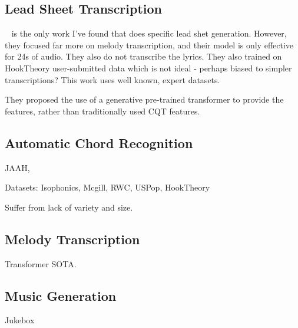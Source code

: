 \subsection{Lead Sheet Transcription}

~\cite{MelodyTranscriptionViaGenerativePreTraining} is the only work I've found that does specific lead shet generation. However, they focused far more on melody transcription, and their model is only effective for 24s of audio. They also do not transcribe the lyrics. They also trained on HookTheory user-submitted data which is not ideal - perhaps biased to simpler transcriptions? This work uses well known, expert datasets.

They proposed the use of a generative pre-trained transformer to provide the features, rather than traditionally used CQT features.

\subsection{Automatic Chord Recognition}

JAAH,

Datasets: Isophonics, Mcgill, RWC, USPop, HookTheory

Suffer from lack of variety and size.

\subsection{Melody Transcription}

Transformer SOTA. 

\subsection{Music Generation}

Jukebox~\cite{Jukebox}